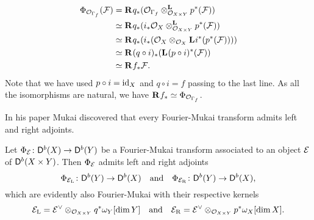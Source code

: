 \begin{example}
\begin{enumerate}[label = (\roman*)]
{    %
    \begin{align*}
        \fm{\struct{\Gamma_f}}(\F) &= \rderived{}{q_*}(\derivedtensor{\struct{\Gamma_f}}{p^*(\F)}{\struct{X \times Y}}) \\
        &\iso \rderived{}{q_*}(\derivedtensor{i_*\struct{X}}{{p^*}(\F)}{\struct{X \times Y}}) \\
        &\iso \rderived{}{q_*}(i_*(\struct{X} \otimes_{\struct{X}}\lderived{}{i^*}({p^*}(\F)))) \\
        &\iso \rderived{}{(q \circ i)_*}(\lderived{}{(p \circ i)^*}(\F)) \\
        &\iso \rderived{}{f_*}\F.
    \end{align*}
    Note that we have used $p \circ i = \id{X}$ and $q \circ i = f$ passing to the last line. As all the isomorphisms are natural, we have $\rderived{}{f_*} \iso \fm{\struct{\Gamma_f}}$.
    }
\end{enumerate}
\end{example}

In his paper \cite{Mukai1981} Mukai discovered that every Fourier-Mukai transform admits left and right adjoints. 

\begin{proposition}[Mukai]
    \label{Adjoints of FM transforms}
    Let $\fm{\E} \colon \derb{X} \to \derb{Y}$ be a Fourier-Mukai transform associated to an object $\E$ of $\derb{X \times Y}$. Then $\fm{\E}$ admits left and right adjoints
    \[
        \fm{\ladj{\E}} \colon \derb{Y} \to \derb{X} \quad \text{and} \quad \fm{\radj{\E}} \colon \derb{Y} \to \derb{X},
    \]
    which are evidently also Fourier-Mukai with their respective kernels
    \[
        \ladj{\E} = \E^\vee \otimes_{\struct{X \times Y}} q^*\omega_Y[\dim Y] \quad \text{and} \quad 
        \radj{\E} = \E^\vee \otimes_{\struct{X \times Y}} p^*\omega_X[\dim X].
    \]
\end{proposition}

